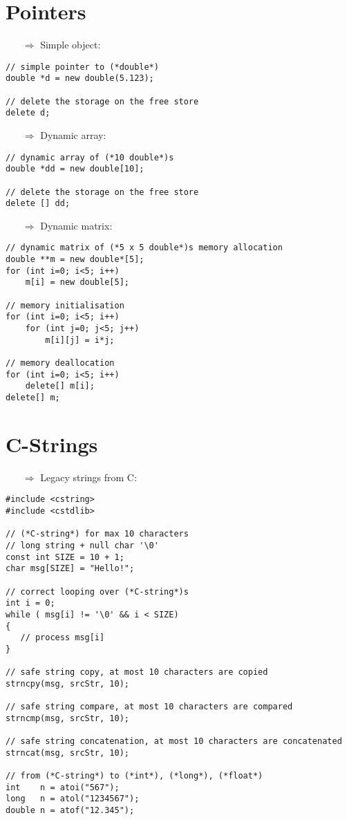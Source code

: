 \documentclass[10pt]{article}
\begin{document}
\section{Pointers}
\small
\begin{enumerate}
\item[$\Rightarrow$] Simple object:
\end{enumerate}
\begin{lstlisting}
// simple pointer to (*double*)
double *d = new double(5.123);

// delete the storage on the free store
delete d;
\end{lstlisting}
\begin{enumerate}
\item[$\Rightarrow$] Dynamic array:
\end{enumerate}
\begin{lstlisting}
// dynamic array of (*10 double*)s
double *dd = new double[10];

// delete the storage on the free store
delete [] dd;
\end{lstlisting}
\begin{enumerate}
\item[$\Rightarrow$] Dynamic matrix:
\end{enumerate}
\begin{lstlisting}
// dynamic matrix of (*5 x 5 double*)s memory allocation
double **m = new double*[5];
for (int i=0; i<5; i++)
    m[i] = new double[5];

// memory initialisation    
for (int i=0; i<5; i++)
    for (int j=0; j<5; j++)
        m[i][j] = i*j;

// memory deallocation
for (int i=0; i<5; i++)
    delete[] m[i];
delete[] m;
\end{lstlisting}
%
%
\section{C-Strings}
\small
\begin{enumerate}
\item[$\Rightarrow$] Legacy strings from C:
\end{enumerate}
\begin{lstlisting}
#include <cstring>
#include <cstdlib>

// (*C-string*) for max 10 characters
// long string + null char '\0'
const int SIZE = 10 + 1;
char msg[SIZE] = "Hello!";

// correct looping over (*C-string*)s
int i = 0;
while ( msg[i] != '\0' && i < SIZE)
{
   // process msg[i]
}

// safe string copy, at most 10 characters are copied
strncpy(msg, srcStr, 10);

// safe string compare, at most 10 characters are compared
strncmp(msg, srcStr, 10);

// safe string concatenation, at most 10 characters are concatenated
strncat(msg, srcStr, 10);

// from (*C-string*) to (*int*), (*long*), (*float*)
int    n = atoi("567");
long   n = atol("1234567");
double n = atof("12.345");
\end{lstlisting}
%
%
\end{document}
